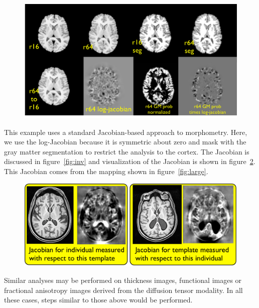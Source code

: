 \documentclass{InsightArticle}
\begin{document}
\begin{figure}
\label{fig:morph}
\includegraphics[width=1\textwidth]{Figures/morphometry.pdf}
\end{figure}
This example uses a standard Jacobian-based approach to morphometry.
Here, we use the log-Jacobian because it is symmetric about zero and
mask with the gray matter segmentation to restrict the analysis to the
cortex.  The Jacobian is discussed in figure~\ref{fig:inv} and visualization of
the Jacobian is shown in figure~\ref{fig:jac}.  This Jacobian comes
from the mapping shown in figure~\ref{fig:large}.
\begin{figure}
\label{fig:jac}
\includegraphics[width=1\textwidth]{Figures/Jacobian.pdf}
\end{figure}
Similar analyses may be performed on thickness images, functional 
images or fractional anisotropy images derived from the diffusion 
tensor modality.  In all these cases, steps similar to those above 
would be performed.  
\end{document}
